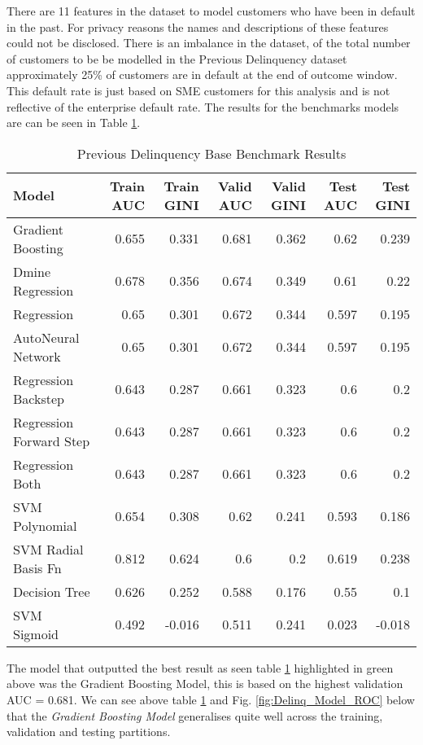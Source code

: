 There are 11 features in the dataset to model customers who have been in default in the past. For privacy reasons the names and descriptions of these features could not be disclosed. There is an imbalance in the dataset, of the total number of customers to be be modelled in the Previous Delinquency dataset approximately 25\% of customers are in default at the end of outcome window. This default rate is just based on SME customers for this analysis and is not reflective of the enterprise default rate. The results for the benchmarks models are can be seen in Table \ref{table:prevdelinqbase}.
\begin{table}[H]
	\centering
	\resizebox{\textwidth}{!}
	{
		\begin{tabular}{l | r | r| r |r| r|r}
			\hline
			\textbf{Model} & \textbf{Train AUC} & \textbf{Train GINI} & \textbf{Valid AUC} & \textbf{Valid GINI}& \textbf{Test AUC} & \textbf{Test GINI}\\
			\hline
			\cellcolor{green!25}Gradient Boosting & \cellcolor{green!25}0.655 & \cellcolor{green!25}0.331 & \cellcolor{green!25}0.681 & \cellcolor{green!25}0.362 & \cellcolor{green!25}0.62 & \cellcolor{green!25}0.239 \\
			Dmine Regression & 0.678 & 0.356 & 0.674 & 0.349 & 0.61 & 0.22 \\
			Regression & 0.65 & 0.301 & 0.672 & 0.344 & 0.597 & 0.195 \\
			AutoNeural Network & 0.65 & 0.301 & 0.672 & 0.344 & 0.597 & 0.195 \\
			Regression Backstep & 0.643 & 0.287 & 0.661 & 0.323 & 0.6 & 0.2 \\
			Regression Forward Step & 0.643 & 0.287 & 0.661 & 0.323 & 0.6 & 0.2 \\
			Regression Both & 0.643 & 0.287 & 0.661 & 0.323 & 0.6 & 0.2 \\
			SVM Polynomial & 0.654 & 0.308 & 0.62 & 0.241 & 0.593 & 0.186 \\
			SVM Radial Basis Fn & 0.812 & 0.624 & 0.6 & 0.2 & 0.619 & 0.238 \\
			Decision Tree & 0.626 & 0.252 & 0.588 & 0.176 & 0.55 & 0.1 \\
			SVM Sigmoid & 0.492 & -0.016 & 0.511 & 0.241 & 0.023 & -0.018 \\
			\hline
		\end{tabular}
	}
	\caption{Previous Delinquency Base Benchmark Results}
	\label{table:prevdelinqbase}
\end{table}

The model that outputted the best result as seen table \ref{table:prevdelinqbase} highlighted in green above  was the Gradient Boosting Model, this is based on the highest validation AUC = 0.681. We can see above table \ref{table:prevdelinqbase} and Fig. \ref{fig:Delinq_Model_ROC} below that the \textit{Gradient Boosting Model} generalises quite well across the training, validation and testing partitions.

